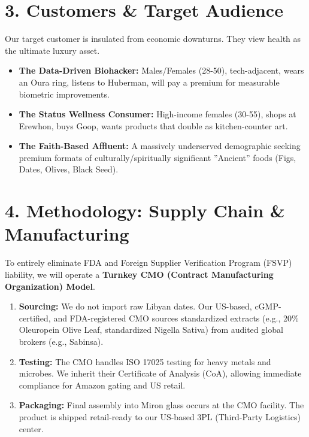 \documentclass[11pt,a4paper]{article}
\begin{document}
\section{3. Customers \& Target Audience}
Our target customer is insulated from economic downturns. They view health as the ultimate luxury asset.
\begin{itemize}
    \item \textbf{The Data-Driven Biohacker:} Males/Females (28-50), tech-adjacent, wears an Oura ring, listens to Huberman, will pay a premium for measurable biometric improvements.
    \item \textbf{The Status Wellness Consumer:} High-income females (30-55), shops at Erewhon, buys Goop, wants products that double as kitchen-counter art.
    \item \textbf{The Faith-Based Affluent:} A massively underserved demographic seeking premium formats of culturally/spiritually significant ''Ancient'' foods (Figs, Dates, Olives, Black Seed).
\end{itemize}

\section{4. Methodology: Supply Chain \& Manufacturing}
To entirely eliminate FDA and Foreign Supplier Verification Program (FSVP) liability, we will operate a \textbf{Turnkey CMO (Contract Manufacturing Organization) Model}.

\begin{enumerate}
    \item \textbf{Sourcing:} We do not import raw Libyan dates. Our US-based, cGMP-certified, and FDA-registered CMO sources standardized extracts (e.g., 20\% Oleuropein Olive Leaf, standardized Nigella Sativa) from audited global brokers (e.g., Sabinsa).
    \item \textbf{Testing:} The CMO handles ISO 17025 testing for heavy metals and microbes. We inherit their Certificate of Analysis (CoA), allowing immediate compliance for Amazon gating and US retail.
    \item \textbf{Packaging:} Final assembly into Miron glass occurs at the CMO facility. The product is shipped retail-ready to our US-based 3PL (Third-Party Logistics) center.
\end{enumerate}

\end{document}
